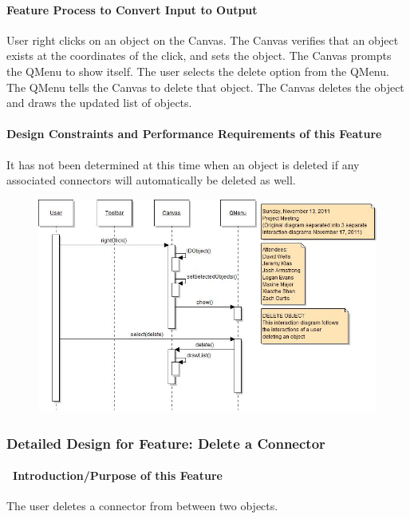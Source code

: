 \documentclass[twoside,letterpaper]{article}
\begin{document}
{\paragraph{Feature Process to Convert Input to Output}
{\color{black}
User right clicks on an object on the Canvas. The Canvas verifies that an object exists at the coordinates of the click, and sets the object.  The Canvas prompts the QMenu to show itself.  The user selects the delete option from the QMenu.  The QMenu tells the Canvas to delete that object. The Canvas deletes the object and draws the updated list of objects.
}

\paragraph{Design Constraints and Performance Requirements of this Feature}
{\color{black}
It has not been determined at this time when an object is deleted if any associated connectors will automatically be deleted as well.
}
\bigskip
\bigskip

\begin{figure}[h]
\centering
\includegraphics[width=6.0in]{IntDelObj.jpg}
\end{figure}

\clearpage


  

\subsubsection{Detailed Design for Feature: Delete a Connector}

\paragraph[\ Introduction/Purpose of this Feature]
{\ Introduction/Purpose of this Feature}
{\color{black}
The user deletes a connector from between two objects.
}

}
\end{document}
